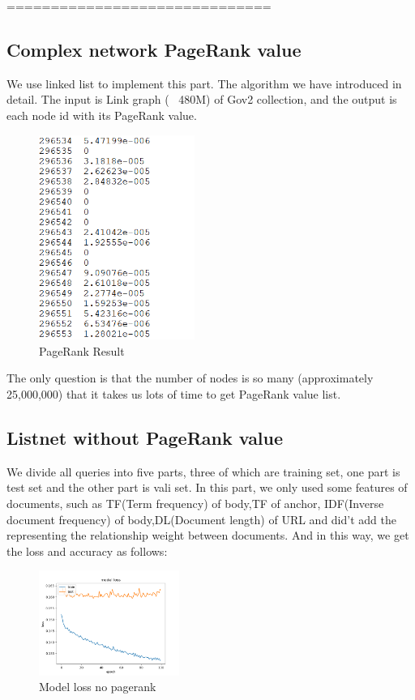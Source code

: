 \documentclass{acmtog} %
\begin{document}
==============================

\subsection{Complex network PageRank value}
We use linked list to implement this part. The algorithm we have introduced in detail. The input is Link graph (~ 480M) of Gov2 collection, and the output is each node id with its PageRank value.

\begin{figure}[htbp]
    \centering
    \includegraphics[width = 2in]{3.png}
    \caption{PageRank Result}
\end{figure}

The only question is that the number of nodes is so many (approximately 25,000,000) that it takes us lots of time to get PageRank value list.

\subsection{Listnet without PageRank value}
We divide all queries into five parts, three of which are training set, one part is test set and the other part is vali set. In this part, we only used some features of documents, such as TF(Term frequency) of body,TF of anchor, IDF(Inverse document frequency) of body,DL(Document length) of URL and did't add the representing the relationship weight between documents. And in this way, we get the loss and accuracy as follows:

\begin{figure}[htbp]
    \centering
    \includegraphics[width = 1.8in]{8.png}
    \caption{Model loss no pagerank}
\end{figure}
\end{document}
